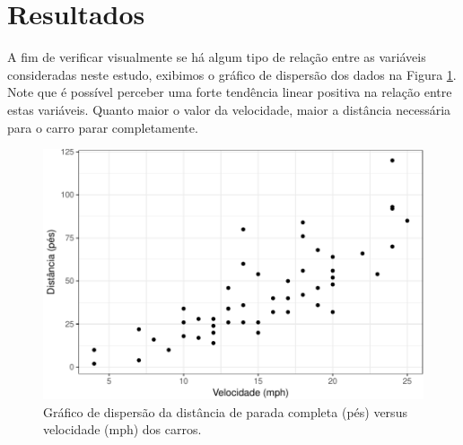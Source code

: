 \documentclass[a4paper,12pt,twoside,printwatermark=true]{modeloLEA}
\numberwithin{equation}{section}
\numberwithin{figure}{section}
\numberwithin{table}{section}
\begin{document}
\hypertarget{resultados}{%
\section{Resultados}\label{resultados}}

A fim de verificar visualmente se há algum tipo de relação entre as
variáveis consideradas neste estudo, exibimos o gráfico de dispersão dos
dados na Figura \ref{fig:GraficoDispersao}. Note que é possível perceber
uma forte tendência linear positiva na relação entre estas variáveis.
Quanto maior o valor da velocidade, maior a distância necessária para o
carro parar completamente.

\begin{Shaded}
\begin{Highlighting}[]
\NormalTok{(}\OperatorTok{+}
\StringTok{  }\NormalTok{() }\OperatorTok{+}
\StringTok{  }\NormalTok{(}\NormalTok{, }\NormalTok{)}
\end{Highlighting}
\end{Shaded}

\begin{figure}[h]

{\centering \includegraphics{skeleton_files/figure-latex/GraficoDispersao-1} 

}

\caption{\label{fig:GraficoDispersao} Gráfico de dispersão da distância de parada completa (pés) versus velocidade (mph) dos carros.}\label{fig:GraficoDispersao}
\end{figure}
\end{document}
